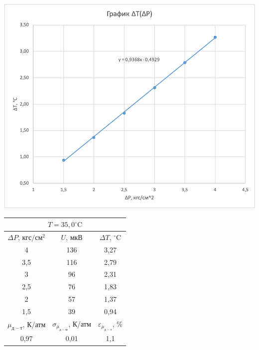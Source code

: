 \documentclass[a4paper, 12pt]{article}
\begin{document}
    \begin{table}[pt]
        
        \begin{minipage}[ht]{0.55\linewidth}
            \includegraphics[width=\linewidth]{images/ch4.png}
        \end{minipage}
        \hfill
        \begin{minipage}[ht]{0.47\linewidth}
            \begin{tabular}{|c|c|c|}
                \hline
                \multicolumn{3}{|c|}{$T = 35,0^{\circ}\text{C}$} \\
                \hline
                $\Delta P$, $кгс/см^2$ & $U$, $мкВ$ & $\Delta T$, $^{\circ}\text{C}$ \\
                \hline
                4 & 136 & 3,27 \\
                \hline
                3,5 & 116 & 2,79 \\
                \hline
                3 & 96 & 2,31 \\
                \hline
                2,5 & 76 & 1,83 \\
                \hline
                2 & 57 & 1,37 \\
                \hline
                1,5 & 39 & 0,94 \\
                \hline
                $\mu_{д-т}$, К/атм & $\sigma_{\mu_{д-м}}$, К/атм & $\varepsilon_{\mu_{д-т}}$, \% \\
                \hline
                0,97 & 0,01 & 1,1 \\
                \hline
            \end{tabular}
        \end{minipage}
        

\end{table}
\end{document}
